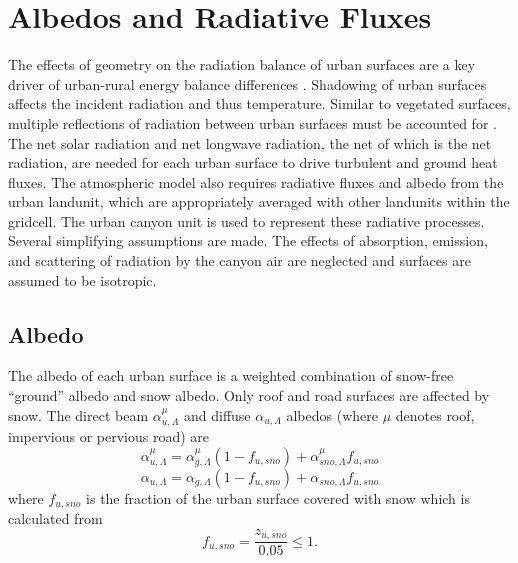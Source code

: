 \documentclass[12pt,authoryear]{elsarticle}
\numberwithin{equation}{section} %
\begin{document}
\section{Albedos and Radiative Fluxes}
\label{sec:albedo_radiation}
%
The effects of geometry on the radiation balance of urban surfaces are a key driver of urban-rural energy balance differences \citep{okeSimulationSurfaceUrban1991}. Shadowing of urban surfaces affects the incident radiation and thus temperature. Similar to vegetated surfaces, multiple reflections of radiation between urban surfaces must be accounted for \citep{harmanRadiativeExchangeUrban2004}. The net solar radiation and net longwave radiation, the net of which is the net radiation, are needed for each urban surface to drive turbulent and ground heat fluxes. The atmospheric model also requires radiative fluxes and albedo from the urban landunit, which are appropriately averaged with other landunits within the gridcell. The urban canyon unit is used to represent these radiative processes. Several simplifying assumptions are made. The effects of absorption, emission, and scattering of radiation by the canyon air are neglected and surfaces are assumed to be isotropic.

\subsection{Albedo}
\label{sec:albedo}
%
The albedo of each urban surface is a weighted combination of snow-free ``ground'' albedo and snow albedo. Only roof and road surfaces are affected by snow. The direct beam $\alpha_{u,\Lambda}^{\mu}$ and diffuse $\alpha_{u,\Lambda}$ albedos (where $\mu$ denotes roof, impervious or pervious road) are
\begin{equation}
\label{alebdo_direct_beam}
\alpha_{u,\Lambda}^{\mu} = \alpha_{g,\Lambda}^{\mu}(1-f_{u,sno})+\alpha_{sno,\Lambda}^{\mu}f_{u,sno}
\end{equation}
\begin{equation}
\label{alebdo_diffuse_beam}
\alpha_{u,\Lambda} = \alpha_{g,\Lambda}(1-f_{u,sno})+\alpha_{sno,\Lambda}f_{u,sno}
\end{equation}
where $f_{u,sno}$ is the fraction of the urban surface covered with snow which is calculated from \citep{bonanLandSurfaceModel1996}
\begin{equation}
\label{eq:urban_snow_fraction}
f_{u,sno} = \frac{z_{u,sno}}{0.05}\leq1.
\end{equation}
\end{document}
